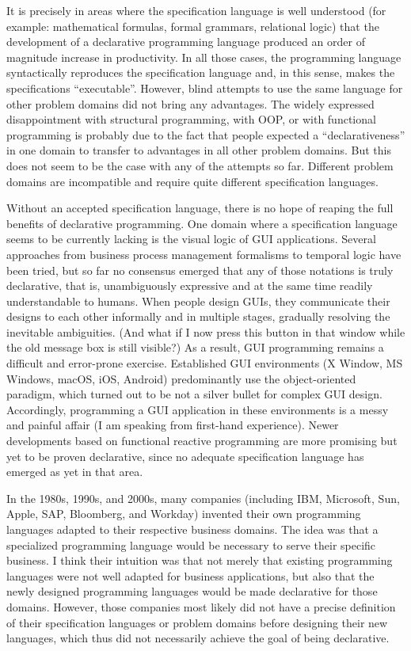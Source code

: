 It is precisely in areas where the specification language is well
understood (for example: mathematical formulas, formal grammars, relational
logic) that the development of a declarative programming language
produced an order of magnitude increase in productivity. In all those
cases, the programming language syntactically reproduces the specification
language and, in this sense, makes the specifications \textsf{``}executable\textsf{''}.
However, blind attempts to use the same language for other problem
domains did not bring any advantages. The widely expressed disappointment
with structural programming, with OOP, or with functional programming
is probably due to the fact that people expected a \textsf{``}declarativeness\textsf{''}
in one domain to transfer to advantages in all other problem domains.
But this does not seem to be the case with any of the attempts so
far. Different problem domains are incompatible and require quite
different specification languages.

Without an accepted specification language, there is no hope of reaping
the full benefits of declarative programming. One domain where a specification
language seems to be currently lacking is the visual logic of GUI
applications. Several approaches \textemdash{} from business process
management formalisms to temporal logic \textemdash{} have been tried,
but so far no consensus emerged that any of those notations is truly
declarative, \textemdash{} that is, unambiguously expressive and at
the same time readily understandable to humans. When people design
GUIs, they communicate their designs to each other informally and
in multiple stages, gradually resolving the inevitable ambiguities.
(\textquotedbl And what if I now press this button in that window
while the old message box is still visible?\textquotedbl ) As a result,
GUI programming remains a difficult and error-prone exercise. Established
GUI environments (X Window, MS Windows, macOS, iOS, Android) predominantly
use the object-oriented paradigm, which turned out to be not a silver
bullet for complex GUI design. Accordingly, programming a GUI application
in these environments is a messy and painful affair (I am speaking
from first-hand experience). Newer developments based on functional
reactive programming are more promising but yet to be proven declarative,
since no adequate specification language has emerged as yet in that
area. 


In the 1980s, 1990s, and 2000s, many companies (including IBM, Microsoft,
Sun, Apple, SAP, Bloomberg, and Workday) invented their own programming
languages adapted to their respective business domains. The idea was
that a specialized programming language would be necessary to serve
their specific business. I think their intuition was that not merely
that existing programming languages were not well adapted for business
applications, but also that the newly designed programming languages
would be made declarative for those domains. However, those companies
most likely did not have a precise definition of their specification
languages or problem domains before designing their new languages,
which thus did not necessarily achieve the goal of being declarative.

